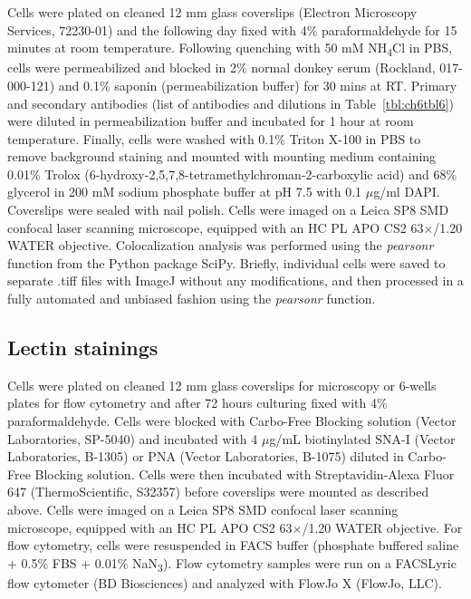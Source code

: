 Cells were plated on cleaned 12 mm glass coverslips (Electron Microscopy Services, 72230-01) and the following day fixed with 4\% paraformaldehyde for 15 minutes at room temperature. Following quenching with 50 mM NH\textsubscript{4}Cl in PBS, cells were permeabilized and blocked in 2\% normal donkey serum (Rockland, 017-000-121) and 0.1\% saponin (permeabilization buffer) for 30 mins at RT. Primary and secondary antibodies (list of antibodies and dilutions in Table~\ref{tbl:ch6tbl6}) were diluted in permeabilization buffer and incubated for 1 hour at room temperature. Finally, cells were washed with 0.1\% Triton X-100 in PBS to remove background staining and mounted with mounting medium containing 0.01\% Trolox (6-hydroxy-2,5,7,8-tetramethylchroman-2-carboxylic acid) and 68\% glycerol in 200 mM sodium phosphate buffer at pH 7.5 with 0.1 $\mu$g/ml DAPI. Coverslips were sealed with nail polish. Cells were imaged on a Leica SP8 SMD confocal laser scanning microscope, equipped with an HC PL APO CS2 63$\times$/1.20 WATER objective. Colocalization analysis was performed using the \emph{pearsonr} function from the Python package SciPy\cite{virtanen_scipy_2020}. Briefly, individual cells were saved to separate .tiff files with ImageJ without any modifications, and then processed in a fully automated and unbiased fashion using the \emph{pearsonr} function.

\subsection{Lectin stainings}

Cells were plated on cleaned 12 mm glass coverslips for microscopy or 6-wells plates for flow cytometry and after 72 hours culturing fixed with 4\% paraformaldehyde. Cells were blocked with Carbo-Free Blocking solution (Vector Laboratories, SP-5040) and incubated with 4 $\mu$g/mL biotinylated SNA-I (Vector Laboratories, B-1305) or PNA (Vector Laboratories, B-1075) diluted in Carbo-Free Blocking solution. Cells were then incubated with Streptavidin-Alexa Fluor 647 (ThermoScientific, S32357) before coverslips were mounted as described above. Cells were imaged on a Leica SP8 SMD confocal laser scanning microscope, equipped with an HC PL APO CS2 63$\times$/1.20 WATER objective. For flow cytometry, cells were resuspended in FACS buffer (phosphate buffered saline + 0.5\% FBS + 0.01\% NaN\textsubscript{3}). Flow cytometry samples were run on a FACSLyric flow cytometer (BD Biosciences) and analyzed with FlowJo X (FlowJo, LLC).

